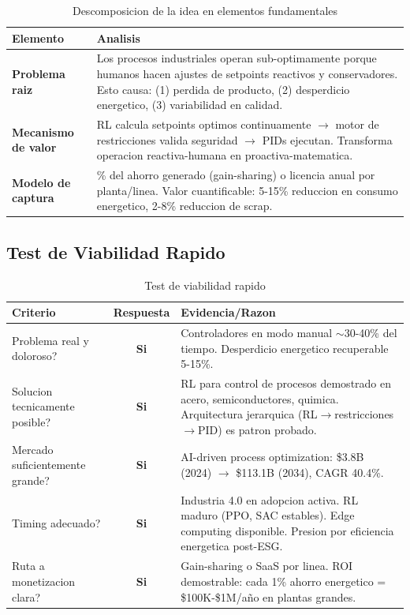 \documentclass[11pt,a4paper]{article}
\begin{document}
\begin{table}[h]
\centering
\begin{tabular}{>{\bfseries}p{3.5cm}p{10cm}}
\toprule
Elemento & Analisis \\
\midrule
Problema raiz & Los procesos industriales operan sub-optimamente porque humanos hacen ajustes de setpoints reactivos y conservadores. Esto causa: (1) perdida de producto, (2) desperdicio energetico, (3) variabilidad en calidad. \\
\addlinespace
Mecanismo de valor & RL calcula setpoints optimos continuamente $\rightarrow$ motor de restricciones valida seguridad $\rightarrow$ PIDs ejecutan. Transforma operacion reactiva-humana en proactiva-matematica. \\
\addlinespace
Modelo de captura & \% del ahorro generado (gain-sharing) o licencia anual por planta/linea. Valor cuantificable: 5-15\% reduccion en consumo energetico, 2-8\% reduccion de scrap. \\
\bottomrule
\end{tabular}
\caption{Descomposicion de la idea en elementos fundamentales}
\end{table}

\subsection{Test de Viabilidad Rapido}

\begin{table}[h]
\centering
\small
\begin{tabular}{p{4.5cm}c p{7cm}}
\toprule
\textbf{Criterio} & \textbf{Respuesta} & \textbf{Evidencia/Razon} \\
\midrule
Problema real y doloroso? & \textcolor{verde}{\textbf{Si}} & Controladores en modo manual $\sim$30-40\% del tiempo. Desperdicio energetico recuperable 5-15\%. \\
\addlinespace
Solucion tecnicamente posible? & \textcolor{verde}{\textbf{Si}} & RL para control de procesos demostrado en acero, semiconductores, quimica. Arquitectura jerarquica (RL$\rightarrow$restricciones$\rightarrow$PID) es patron probado. \\
\addlinespace
Mercado suficientemente grande? & \textcolor{verde}{\textbf{Si}} & AI-driven process optimization: \$3.8B (2024) $\rightarrow$ \$113.1B (2034), CAGR 40.4\%. \\
\addlinespace
Timing adecuado? & \textcolor{verde}{\textbf{Si}} & Industria 4.0 en adopcion activa. RL maduro (PPO, SAC estables). Edge computing disponible. Presion por eficiencia energetica post-ESG. \\
\addlinespace
Ruta a monetizacion clara? & \textcolor{verde}{\textbf{Si}} & Gain-sharing o SaaS por linea. ROI demostrable: cada 1\% ahorro energetico = \$100K-\$1M/año en plantas grandes. \\
\bottomrule
\end{tabular}
\caption{Test de viabilidad rapido}
\end{table}
\end{document}
